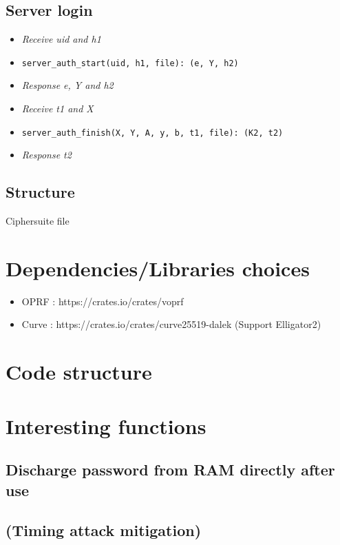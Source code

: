 \documentclass[../report.tex]{subfiles}
\begin{document}
\subsection{Server login}
\begin{itemize}
 \item \emph{Receive uid and h1}
 \item \verb|server_auth_start(uid, h1, file): (e, Y, h2)|
 \item \emph{Response e, Y and h2}
 \item \emph{Receive t1 and X}
 \item \verb|server_auth_finish(X, Y, A, y, b, t1, file): (K2, t2)|
 \item \emph{Response t2}

\end{itemize}

\subsection{Structure}
Ciphersuite
file

\section{Dependencies/Libraries choices}
\begin{itemize}
 \item OPRF : https://crates.io/crates/voprf
 \item Curve : https://crates.io/crates/curve25519-dalek (Support Elligator2)
\end{itemize}

\section{Code structure}
\section{Interesting functions}
\subsection{Discharge password from RAM directly after use}
\subsection{(Timing attack mitigation)}
\end{document}
